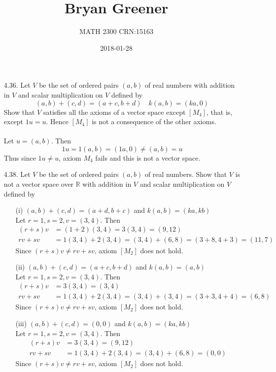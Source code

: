 \documentclass[12pt]{article}
\title{Bryan Greener}
\author{MATH 2300 CRN:15163}
\date{2018-01-28}
\begin{document}
\maketitle

\TabPositions{4cm}

\begin{enumerate}
\item[4.36.] Let $V$ be the set of ordered pairs $(a,b)$ of real numbers with addition in $V$ and scalar multiplication on $V$ defined by
			\[ (a,b) + (c,d) = (a+c,b+d) \quad k(a,b) = (ka,0) \]
			Show that $V$ satisfies all the axioms of a vector space except $[M_4]$, that is, except $1u=u$. Hence $[M_4]$ is not a consequence of the other axioms.\\~\\
			Let $u=(a,b)$. Then
			\[ 1u = 1(a,b) = (1a, 0) \neq (a,b) = u \]
			Thus since $1u \neq u$, axiom $M_4$ fails and this is not a vector space.
			
\item[4.38.] Let $V$ be the set of ordered pairs $(a,b)$ of real numbers. Show that $V$ is not a vector space over $\mathbb{R}$ with addition in $V$ and scalar multiplication on $V$ defined by
	\begin{enumerate}
	\item[(i)] $(a,b)+(c,d)=(a+d,b+c)$ and $k(a,b)=(ka,kb)$\\
		Let $r=1,s=2,v=(3,4)$. Then
		\begin{align*}
		(r+s)v &= (1+2)(3,4) = 3(3,4) = (9,12)\\
		rv + sv &= 1(3,4) + 2(3,4) = (3,4) + (6,8) = (3+8,4+3) = (11,7)
		\end{align*}
		Since $(r+s)v \neq rv + sv$, axiom $[M_2]$ does not hold.\\
		
	\item[(ii)] $(a,b)+(c,d)=(a+c,b+d)$ and $k(a,b)=(a,b)$\\
		Let $r=1,s=2,v=(3,4)$. Then
		\begin{align*}
		(r+s)v &= 3(3,4) = (3,4)\\
		rv + sv &= 1(3,4) + 2(3,4) = (3,4) + (3,4) = (3+3,4+4) = (6,8)
		\end{align*}
		Since $(r+s)v \neq rv + sv$, axiom $[M_2]$ does not hold.\\

\pagebreak	
	\item[(iii)] $(a,b)+(c,d)=(0,0)$ and $k(a,b)=(ka,kb)$\\
		Let $r=1,s=2,v=(3,4)$. Then
		\begin{align*}
		(r+s)v &= 3(3,4) = (9,12)\\
		rv + sv &= 1(3,4) + 2(3,4) = (3,4) + (6,8) = (0,0)
		\end{align*}
		Since $(r+s)v \neq rv + sv$, axiom $[M_2]$ does not hold.\\
	

\end{enumerate}
\end{enumerate}
\end{document}
